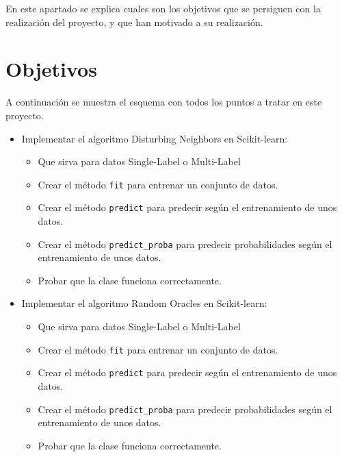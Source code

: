 
En este apartado se explica cuales son los objetivos que se persiguen con la realización del proyecto, y que han motivado a su realización.

\section{Objetivos}
A continuación se muestra el esquema con todos los puntos a tratar en este proyecto.
\begin{itemize}
\item Implementar el algoritmo Disturbing Neighbors en Scikit-learn:
	\begin{itemize}
		\item Que sirva para datos Single-Label o Multi-Label
		\item Crear el método \texttt{fit} para entrenar un conjunto de datos.
		\item Crear el método \texttt{predict} para predecir según el entrenamiento de unos datos.
		\item Crear el método \texttt{predict\_proba} para predecir probabilidades según el entrenamiento de unos datos.
		\item Probar que la clase funciona correctamente.
	\end{itemize}
	
\item Implementar el algoritmo Random Oracles en Scikit-learn:
	\begin{itemize}
		\item Que sirva para datos Single-Label o Multi-Label
		\item Crear el método \texttt{fit} para entrenar un conjunto de datos.
		\item Crear el método \texttt{predict} para predecir según el entrenamiento de unos datos.
		\item Crear el método \texttt{predict\_proba} para predecir probabilidades según el entrenamiento de unos datos.
		\item Probar que la clase funciona correctamente.
	\end{itemize}
	

\end{itemize}
